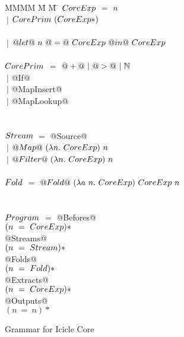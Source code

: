 
\begin{figure}

\begin{tabbing}
MMMM \= M \= M \= \kill
$\mit{CoreExp}$
    \> $=$  \> $n$          \\
    \> $~|$ \> $\mit{CorePrim}~(\mit{CoreExp}*)$ \\
\\
    \> $~|$ \> $@let@~n~@=@~\mit{CoreExp}~@in@~\mit{CoreExp}$ \\
\\
$\mit{CorePrim}$
    \> $=$  \> $@+@~|~@>@~|~\mathbb{N}$ \\
    \> $~|$ \> @If@ \\
    \> $~|$ \> @MapInsert@ \\
    \> $~|$ \> @MapLookup@ \\
\\
\\
$\mit{Stream}$
    \> $=$  \>  @Source@ \\
    \> $~|$ \> $@Map@~(\lambda{}n.~\mit{CoreExp})~n$ \\
    \> $~|$ \> $@Filter@~(\lambda{}n.~\mit{CoreExp})~n$ \\
\\
$\mit{Fold}$
    \> $=$  \> $@Fold@~(\lambda{}a~n.~\mit{CoreExp})~\mit{CoreExp}~n$ \\
\\
\\
$\mit{Program}$
    \> $=$  \> @Befores@ \\
    \>      \> \> $(n~=~\mit{CoreExp})*$ \\
    \>      \> @Streams@ \\
    \>      \> \> $(n~=~\mit{Stream})*$ \\
    \>      \> @Folds@ \\
    \>      \> \> $(n~=~\mit{Fold})*$ \\
    \>      \> @Extracts@ \\
    \>      \> \> $(n~=~\mit{CoreExp})*$ \\
    \>      \> @Outputs@ \\
    \>      \> \> $(n~=~n)*$ \\
\end{tabbing}


\caption{Grammar for Icicle Core}
\label{fig:core:grammar}
\end{figure}

